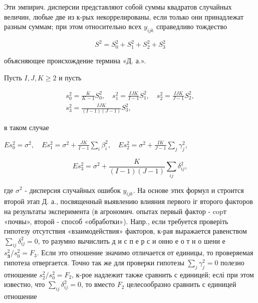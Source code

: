 \documentclass[10pt]{article}
\begin{document}
Эти эмпирич. дисперсии представляют собой суммы квадратов случайных величин, любые две из к-рых некоррелированы, если только они принадлежат разным суммам; при этом относительно всех $y_{i j k}$ справедливо тождество



\[

S^{2}=S_{0}^{2}+S_{1}^{2}+S_{2}^{2}+S_{3}^{2}

\]



объясняющее происхождение термина «Д. а.».



Пусть $I, J, K \geqslant 2$ и пусть



\[

\begin{gathered}

s_{0}^{2}=\frac{K}{K-1} S_{0}^{2}, \quad s_{1}^{2}=\frac{I J K}{I-1} S_{1}^{2}, \quad s_{2}^{2}=\frac{I J K}{J-1} S_{2}^{2}, \\

s_{3}^{2}=\frac{I J K}{(I-1)(J-1)} S_{3}^{2},

\end{gathered}

\]



в таком случае



$E s_{0}^{2}=\sigma^{2}, \quad E s_{1}^{2}=\sigma^{2}+\frac{J K}{I-1} \sum_{i} \beta_{i}^{2}, \quad E s_{2}^{2}=\sigma^{2}+\frac{I K}{J-1} \sum_{j} \gamma_{j}^{2}$,



\[

E s_{3}^{2}=\sigma^{2}+\frac{K}{(I-1)(J-1)} \sum_{i j} \delta_{i j}^{2},

\]



где $\sigma^{2}$ - дисперсия случайных ошибок $y_{i j k}$. На основе этих формул и строится второй этап Д. а., посвященный выявлению влияния первого іг второго факторов на результаты эксперимента (в агрономич. опытах первый фактор - copт «почвы», второй - способ «обработки»). Напр., если требуется проверіть гипотезу отсутствия «взаимодействия» факторов, к-рая выражается равенством $\sum_{i j} \delta_{i j}^{2}=0$, то разумно вычислить д и с п е р с и онно е о т н о шени е $s_{\mathbf{3}}^{2} / s_{0}^{2}=F_{3}$. Если это отношение значимо отличается от единицы, то проверяемая гипотеза отвергается. Точно так же для проверки гипотезы $\sum_{j} \gamma_{j}^{2}=0$ полезно отношение $s_{2}^{2} / s_{0}^{2}=F_{2}$, к-рое надлежит также сравнить с единицей; еслі при этом известно, что $\sum_{i j} \delta_{i j}^{2}=0$, то вместо $F_{2}$ целесообразно сравнить с единицей отношение
\end{document}
